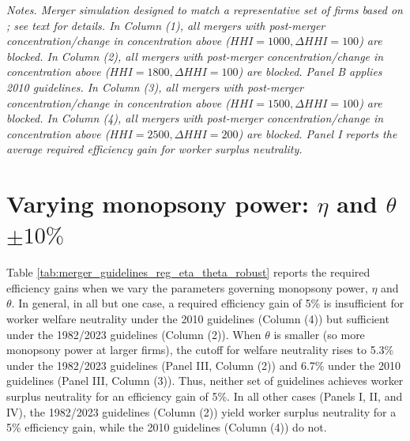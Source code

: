 \documentclass[12pt]{article}
\theoremstyle{prop}
\begin{document}
\begin{table}[p!]
    \centering
    \resizebox{\textwidth}{!}{}
    \caption{Increasing returns to scale. \label{tab:merger_guidelines_welfare_irs}}
    \begin{footnotesize}
    \begin{flushleft}
     \textit{Notes.  Merger simulation designed to match a representative set of firms based on \citet{Arnold}; see text for details.  In Column (1), all mergers with post-merger concentration/change in concentration above ($HHI=1000, \Delta HHI=100$) are blocked.  In Column (2), all mergers with post-merger concentration/change in concentration above ($HHI=1800, \Delta HHI=100$) are blocked. Panel B applies 2010 guidelines. In Column (3), all mergers with post-merger concentration/change in concentration above ($HHI=1500, \Delta HHI=100$) are blocked.  In Column (4), all mergers with post-merger concentration/change in concentration above ($HHI=2500, \Delta HHI=200$) are blocked. Panel I  reports the average required efficiency gain for worker surplus neutrality.   }   
     \end{flushleft}
    \end{footnotesize}
\end{table}



\section{Varying monopsony power: $\eta$ and $\theta$ $\pm10\%$}
\label{app:eta_theta_robust}

Table \ref{tab:merger_guidelines_reg_eta_theta_robust} reports the required efficiency gains when we vary the parameters governing monopsony power, $\eta$ and $\theta$. In general, in all but one case, a required efficiency gain of 5\% is insufficient for worker welfare neutrality under the 2010 guidelines (Column (4)) but sufficient under the 1982/2023 guidelines (Column (2)). When $\theta$ is smaller (so more monopsony power at larger firms), the cutoff for welfare neutrality rises to 5.3\% under the 1982/2023 guidelines (Panel III, Column (2)) and 6.7\% under the 2010 guidelines (Panel III, Column (3)).  Thus, neither set of guidelines achieves worker surplus neutrality for an efficiency gain of 5\%. In all other cases (Panels I, II, and IV), the 1982/2023 guidelines (Column (2)) yield worker surplus neutrality for a 5\% efficiency gain, while the 2010 guidelines (Column (4)) do not.
\end{document}
